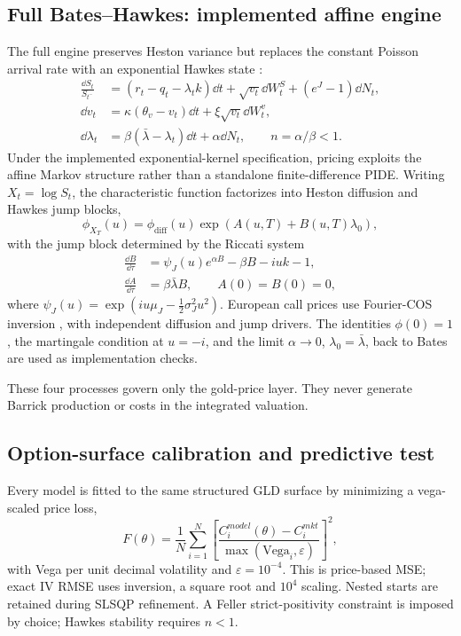 \subsection{Full Bates--Hawkes: implemented affine engine}
The full engine preserves Heston variance but replaces the constant Poisson arrival rate with an exponential Hawkes state \citep{hawkes1971}:
\begin{align}
\frac{\dd S_t}{S_{t^-}}&=(r_t-q_t-\lambda_t k)\dd t+\sqrt{v_t}\dd W_t^S+(e^J-1)\dd N_t,\\
\dd v_t&=\kappa(\theta_v-v_t)\dd t+\xi\sqrt{v_t}\dd W_t^v,\\
\dd\lambda_t&=\beta(\bar\lambda-\lambda_t)\dd t+\alpha\dd N_t,
\qquad n=\alpha/\beta<1.
\label{eq:full_bh_sde}
\end{align}
Under the implemented exponential-kernel specification, pricing exploits the affine Markov structure rather than a standalone finite-difference PIDE. Writing $X_t=\log S_t$, the characteristic function factorizes into Heston diffusion and Hawkes jump blocks,
\begin{equation}
\phi_{X_T}(u)=\phi_{\mathrm{diff}}(u)\exp\!\left(A(u,T)+B(u,T)\lambda_0\right),
\label{eq:bh_cf}
\end{equation}
with the jump block determined by the Riccati system
\begin{align}
\frac{\dd B}{\dd\tau}&=\psi_J(u)e^{\alpha B}-\beta B-iuk-1,\\
\frac{\dd A}{\dd\tau}&=\beta\bar\lambda B,
\qquad A(0)=B(0)=0,
\label{eq:bh_riccati}
\end{align}
where $\psi_J(u)=\exp(iu\mu_J-\tfrac12\sigma_J^2u^2)$. European call prices use Fourier-COS inversion \citep{cos2008}, with independent diffusion and jump drivers. The identities $\phi(0)=1$, the martingale condition at $u=-i$, and the limit $\alpha\to0$, $\lambda_0=\bar\lambda$, back to Bates are used as implementation checks.

\begin{methodbox}
These four processes govern only the gold-price layer. They never generate Barrick production or costs in the integrated valuation.
\end{methodbox}

\subsection{Option-surface calibration and predictive test}
Every model is fitted to the same structured GLD surface by minimizing a vega-scaled price loss,
\begin{equation}
F(\theta)=\frac{1}{N}\sum_{i=1}^{N}
\left[\frac{C_i^{model}(\theta)-C_i^{mkt}}
{\max(\mathrm{Vega}_i,\varepsilon)}\right]^2,
\label{eq:calibration_loss}
\end{equation}
with Vega per unit decimal volatility and $\varepsilon=10^{-4}$. This is price-based MSE; exact IV RMSE uses inversion, a square root and $10^4$ scaling. Nested starts are retained during SLSQP refinement. A Feller strict-positivity constraint is imposed by choice; Hawkes stability requires $n<1$.

